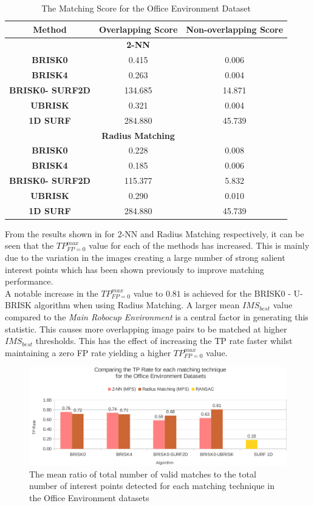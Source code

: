 \documentclass[11pt]{report}
\begin{document}
\begin{table}
\centering
\caption{The Matching Score for the Office Environment Dataset}
\begin{tabular}{|c|c|c|}
\hline 
\textbf{Method} & \textbf{Overlapping Score} & \textbf{Non-overlapping Score}\tabularnewline
\hline 
\hline 
 & \textbf{2-NN} & \tabularnewline
\hline 
\textbf{BRISK0} & 0.415 & 0.006\tabularnewline
\hline 
\textbf{BRISK4} & 0.263 & 0.004\tabularnewline
\hline 
\textbf{BRISK0- SURF2D} & 134.685 & 14.871\tabularnewline
\hline 
\textbf{UBRISK} & 0.321 & 0.004\tabularnewline
\hline 
\textbf{1D SURF} & 284.880 & 45.739\tabularnewline
\hline 
 & \textbf{Radius Matching} & \tabularnewline
\hline 
\textbf{BRISK0} & 0.228 & 0.008\tabularnewline
\hline 
\textbf{BRISK4} & 0.185 & 0.006\tabularnewline
\hline 
\textbf{BRISK0- SURF2D} & 115.377 & 5.832\tabularnewline
\hline 
\textbf{UBRISK} & 0.290 & 0.010\tabularnewline
\hline 
\textbf{1D SURF} & 284.880 & 45.739\tabularnewline
\hline 
\end{tabular}
\label{tab:oeMS}
\end{table}


From the results shown in  for 2-NN and Radius Matching respectively, it can be seen that the $TP_{FP=0}^{max}$ value for each of the methods has increased. This is mainly due to the variation in the images creating a large number of strong salient interest points which has been shown previously to improve matching performance.\\

A notable increase in the $TP_{FP=0}^{max}$ value to $0.81$ is achieved for the BRISK0 - U-BRISK algorithm when using Radius Matching. A larger mean $IMS_{best}$ value compared to the \textit{Main Robocup Environment} is a central factor in generating this statistic. This causes more overlapping image pairs to be matched at higher $IMS_{best}$ thresholds. This has the effect of increasing the TP rate faster whilst maintaining a zero FP rate yielding a higher $TP_{FP=0}^{max}$ value.\\

\begin{figure}
  \centering
    \includegraphics[width=1.0\textwidth]{../Drawings/Graphs/tp_rate_oe.pdf}
    \caption{The mean ratio of total number of valid matches to the total number of interest points detected for each matching technique in the Office Environment datasets} 
    \label{fig:tp_rate_oe}
\end{figure}
\end{document}
